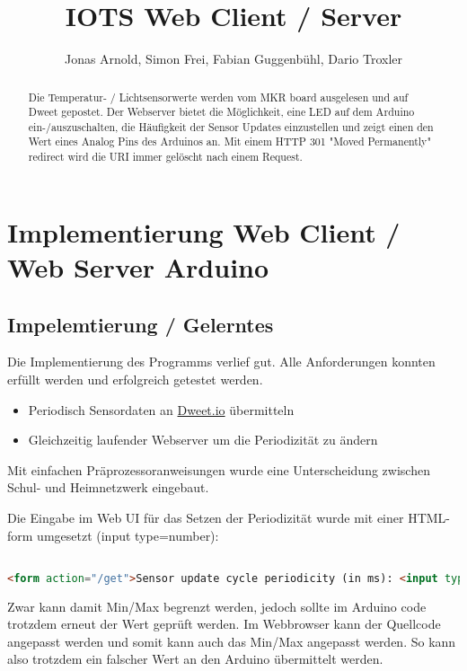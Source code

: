 \documentclass{article}
\title{IOTS Web Client / Server}
\author{Jonas Arnold, Simon Frei, Fabian Guggenbühl, Dario Troxler}
\begin{document}
\maketitle

\begin{abstract}
Die Temperatur- / Lichtsensorwerte werden vom MKR board ausgelesen und auf Dweet gepostet. Der Webserver bietet die Möglichkeit, eine LED auf dem Arduino ein-/auszuschalten, die Häufigkeit der Sensor Updates einzustellen und zeigt einen den Wert eines Analog Pins des Arduinos an. Mit einem HTTP 301 "Moved Permanently" redirect wird die URI immer gelöscht nach einem Request.
\end{abstract}

\section{Implementierung Web Client / Web Server Arduino}

\subsection{Impelemtierung / Gelerntes}

Die Implementierung des Programms verlief gut. Alle Anforderungen konnten erfüllt werden und erfolgreich getestet werden.
\begin{itemize}
\item Periodisch Sensordaten an \href{https://dweet.io/follow/IOTS2021}{Dweet.io} übermitteln
\item Gleichzeitig laufender Webserver um die Periodizität zu ändern
\end{itemize}

Mit einfachen Präprozessoranweisungen wurde eine Unterscheidung zwischen Schul- und Heimnetzwerk eingebaut.

Die Eingabe im Web UI für das Setzen der Periodizität wurde mit einer HTML-form umgesetzt (input type=number):
\begin{lstlisting}[frame=single, language=html, breaklines=true]  % Start your code-block

<form action="/get">Sensor update cycle periodicity (in ms): <input type="number" name="periodMs" min="2000" max="60000" value="10000"><input type="submit" value="Set">

\end{lstlisting}
Zwar kann damit Min/Max begrenzt werden, jedoch sollte im Arduino code trotzdem erneut der Wert geprüft werden. Im Webbrowser kann der Quellcode angepasst werden und somit kann auch das Min/Max angepasst werden. So kann also trotzdem ein falscher Wert an den Arduino übermittelt werden.
\end{document}
